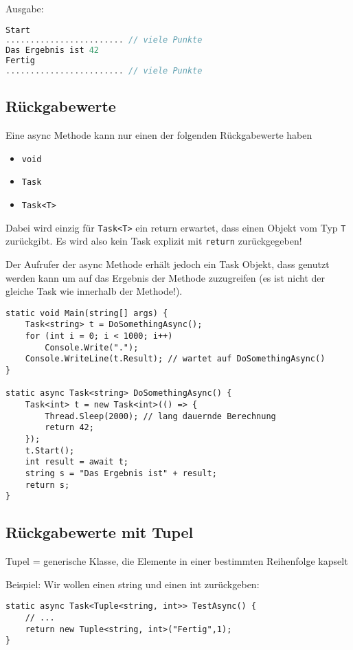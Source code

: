 Ausgabe:
\begin{lstlisting}[language=C]
Start
........................ // viele Punkte
Das Ergebnis ist 42
Fertig
........................ // viele Punkte
\end{lstlisting}

\subsection{Rückgabewerte}

Eine async Methode kann nur einen der folgenden Rückgabewerte haben

\begin{itemize}
\item \lstinline`void`
\item \lstinline`Task`
\item \lstinline`Task<T>`
\end{itemize}
Dabei wird einzig für \lstinline`Task<T>` ein return erwartet, dass einen Objekt vom Typ \lstinline`T` zurückgibt. Es wird also kein Task explizit mit \lstinline$return$ zurückgegeben!

Der Aufrufer der async Methode erhält jedoch ein Task Objekt, dass genutzt werden kann um auf das Ergebnis der Methode zuzugreifen (es ist nicht der gleiche Task wie innerhalb der Methode!).

\begin{lstlisting}[language={[Sharp]C}]
static void Main(string[] args) { 
	Task<string> t = DoSomethingAsync(); 
	for (int i = 0; i < 1000; i++) 
		Console.Write("."); 
	Console.WriteLine(t.Result); // wartet auf DoSomethingAsync()
} 

static async Task<string> DoSomethingAsync() { 
	Task<int> t = new Task<int>(() => { 
		Thread.Sleep(2000); // lang dauernde Berechnung 
		return 42; 
	}); 
	t.Start(); 
	int result = await t; 
	string s = "Das Ergebnis ist" + result; 
	return s; 
} 
\end{lstlisting}

\subsection{Rückgabewerte mit Tupel}

Tupel = generische Klasse, die Elemente in einer bestimmten Reihenfolge kapselt

Beispiel: Wir wollen einen string und einen int zurückgeben:
\begin{lstlisting}[language={[Sharp]C}]
static async Task<Tuple<string, int>> TestAsync() {
	// ...
	return new Tuple<string, int>("Fertig",1);
}
\end{lstlisting}

